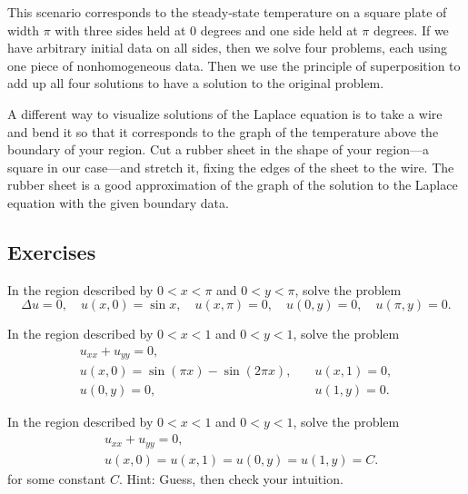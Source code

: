 This scenario
corresponds to the steady-state temperature on a square plate of width $\pi$
with three sides held at 0 degrees and one side held at $\pi$ degrees.
If we have arbitrary initial data on all sides, then we solve four problems,
each using one piece of nonhomogeneous data.  Then we use the principle of
superposition to add up all four solutions to have a solution to the
original problem.

A different
way to visualize solutions of the Laplace equation is to
take a wire and bend
it so that it corresponds to the graph of the
temperature above the boundary of your region.  Cut a rubber sheet in
the shape of your region---a square in our case---and stretch it,
fixing the edges of the sheet to the wire.
The rubber sheet is a good approximation of the graph of the solution to
the Laplace equation with the given boundary data.

\subsection{Exercises}

\begin{exercise}
In the region described by $0 < x < \pi$ and $0 < y < \pi$,
solve the problem
\begin{equation*}
\Delta u = 0, \quad u(x,0) = \sin x, \quad u(x,\pi) = 0,
\quad u(0,y) = 0, 
\quad u(\pi,y) = 0 .
\end{equation*}
\end{exercise}

\begin{exercise}
In the region described by $0 < x < 1$ and $0 < y < 1$,
solve the problem
\begin{equation*}
\begin{array}{ll}
u_{xx} + u_{yy} = 0, & \\
u(x,0) = \sin (\pi x) - \sin (2\pi x), \quad & u(x,1) = 0, \\
u(0,y) = 0, \quad & u(1,y) = 0 .
\end{array}
\end{equation*}
\end{exercise}

\begin{exercise}
In the region described by $0 < x < 1$ and $0 < y < 1$,
solve the problem
\begin{align*}
& u_{xx} + u_{yy} = 0, \\
& u(x,0) = u(x,1) = u(0,y) = u(1,y) = C .
\end{align*}
for some constant $C$.  Hint: Guess, then check your intuition.
\end{exercise}

